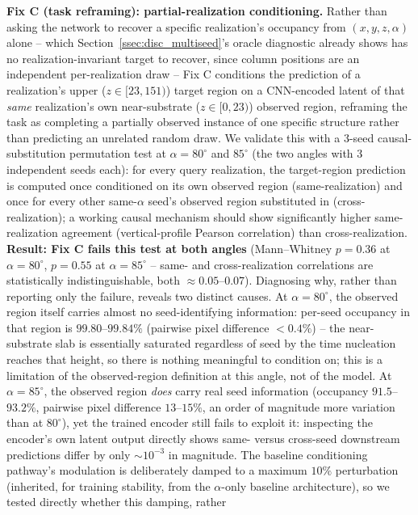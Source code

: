 \documentclass[aip,amsmath,amssymb,reprint]{revtex4-1}
\renewcommand{\ang}{\ensuremath{\alpha}} %
\begin{document}
\textbf{Fix C (task reframing): partial-realization conditioning.} Rather than
asking the network to recover a specific realization's occupancy from
$(x,y,z,\ang)$ alone -- which Section~\ref{ssec:disc_multiseed}'s oracle
diagnostic already shows has no realization-invariant target to recover, since
column positions are an independent per-realization draw -- Fix C conditions
the prediction of a realization's upper ($z\in[23,151)$) target region on a
CNN-encoded latent of that \emph{same} realization's own near-substrate
($z\in[0,23)$) observed region, reframing the task as completing a partially
observed instance of one specific structure rather than predicting an
unrelated random draw. We validate this with a 3-seed causal-substitution
permutation test at $\ang=80^{\circ}$ and $85^{\circ}$ (the two angles with 3 independent
seeds each): for every query realization, the target-region prediction is
computed once conditioned on its own observed region (same-realization) and
once for every other same-$\ang$ seed's observed region substituted in
(cross-realization); a working causal mechanism should show significantly
higher same-realization agreement (vertical-profile Pearson correlation) than
cross-realization. \textbf{Result: Fix C fails this test at both angles}
(Mann--Whitney $p=0.36$ at $\ang=80^{\circ}$, $p=0.55$ at $\ang=85^{\circ}$ -- same- and
cross-realization correlations are statistically indistinguishable, both
$\approx 0.05$--$0.07$). Diagnosing why, rather than reporting only the
failure, reveals two distinct causes. At $\ang=80^{\circ}$, the observed region
itself carries almost no seed-identifying information: per-seed occupancy in
that region is $99.80$--$99.84\%$ (pairwise pixel difference
$<0.4\%$) -- the near-substrate slab is essentially saturated regardless of
seed by the time nucleation reaches that height, so there is nothing
meaningful to condition on; this is a limitation of the observed-region
definition at this angle, not of the model. At $\ang=85^{\circ}$, the observed region
\emph{does} carry real seed information (occupancy $91.5$--$93.2\%$, pairwise
pixel difference $13$--$15\%$, an order of magnitude more variation than at
$80^{\circ}$), yet the trained encoder still fails to exploit it: inspecting the
encoder's own latent output directly shows same- versus cross-seed downstream
predictions differ by only $\sim 10^{-3}$ in magnitude. The baseline
conditioning pathway's modulation is deliberately damped to a maximum $10\%$
perturbation (inherited, for training stability, from the $\ang$-only
baseline architecture), so we tested directly whether this damping, rather
\end{document}
